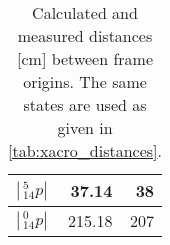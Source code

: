 \begin{table}[htbp]
{\begin{tabular}{l r r}
$|\,^5_{14} p|$ & 37.14 & 38\\\hline %
$|\,^0_{14} p|$ & 215.18 & 207
\end{tabular}
\label{tab:state7dh}%
}\hfill
\setlength{\tabcolsep}{6pt}
\caption{Calculated and measured distances [cm] between frame origins. The same states are used as given in \autoref{tab:xacro_distances}.}
\label{tab:DH_distances}
\end{table}




